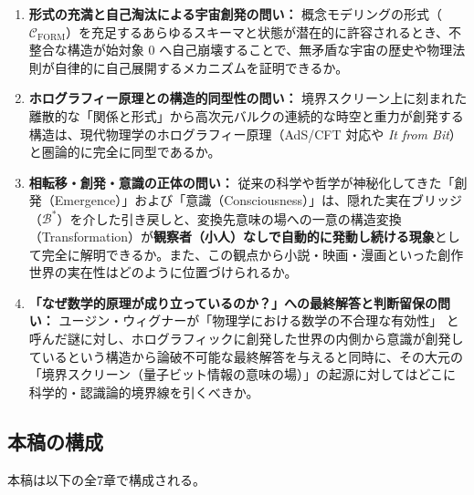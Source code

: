 \documentclass[11pt,a4paper]{ltjsarticle}
\theoremstyle{definition}
\theoremstyle{plain}
\begin{document}
\begin{enumerate}
    \item \textbf{形式の充満と自己淘汰による宇宙創発の問い：} 概念モデリングの形式（$\mathcal{C}_{\mathrm{FORM}}$）を充足するあらゆるスキーマと状態が潜在的に許容されるとき、不整合な構造が始対象 $0$ へ自己崩壊することで、無矛盾な宇宙の歴史や物理法則が自律的に自己展開するメカニズムを証明できるか。
    \item \textbf{ホログラフィー原理との構造的同型性の問い：} 境界スクリーン上に刻まれた離散的な「関係と形式」から高次元バルクの連続的な時空と重力が創発する構造は、現代物理学のホログラフィー原理（AdS/CFT 対応や \textit{It from Bit}）と圏論的に完全に同型であるか。
    \item \textbf{相転移・創発・意識の正体の問い：} 従来の科学や哲学が神秘化してきた「創発（Emergence）」および「意識（Consciousness）」は、隠れた実在ブリッジ（$\mathcal{B}^*$）を介した引き戻しと、変換先意味の場への一意の構造変換（Transformation）が\textbf{観察者（小人）なしで自動的に発動し続ける現象}として完全に解明できるか。また、この観点から小説・映画・漫画といった創作世界の実在性はどのように位置づけられるか。
    \item \textbf{「なぜ数学的原理が成り立っているのか？」への最終解答と判断留保の問い：} ユージン・ウィグナーが「物理学における数学の不合理な有効性」\cite{Wigner1960} と呼んだ謎に対し、ホログラフィックに創発した世界の内側から意識が創発しているという構造から論破不可能な最終解答を与えると同時に、その大元の「境界スクリーン（量子ビット情報の意味の場）」の起源に対してはどこに科学的・認識論的境界線を引くべきか。
\end{enumerate}

\subsection{本稿の構成}
本稿は以下の全7章で構成される。
\end{document}
